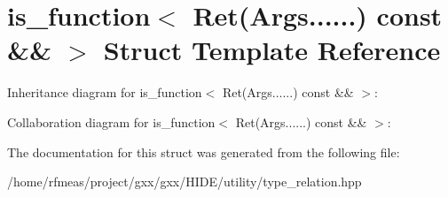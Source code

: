 \hypertarget{structis__function_3_01Ret_07Args_8_8_8_8_8_8_08_01const_01_6_6_01_4}{}\section{is\+\_\+function$<$ Ret(Args......) const \&\& $>$ Struct Template Reference}
\label{structis__function_3_01Ret_07Args_8_8_8_8_8_8_08_01const_01_6_6_01_4}


Inheritance diagram for is\+\_\+function$<$ Ret(Args......) const \&\& $>$\+:


Collaboration diagram for is\+\_\+function$<$ Ret(Args......) const \&\& $>$\+:


The documentation for this struct was generated from the following file\+:\begin{DoxyCompactItemize}
\item 
/home/rfmeas/project/gxx/gxx/\+H\+I\+D\+E/utility/type\+\_\+relation.\+hpp\end{DoxyCompactItemize}
